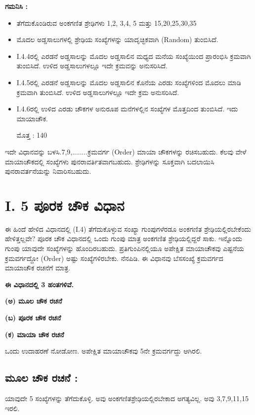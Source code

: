 \noindent	\textbf{ಗಮನಿಸಿ :}
\begin{itemize}
	\item ತೆಗೆದುಕೊಂಡಿರುವ ಅಂಕಗಣಿತ ಶ್ರೇಢಿಗಳು 1,2, 3,4, 5 ಮತ್ತು 15,20,25,30,35
	\item ಮೊದಲ ಅಡ್ಡಸಾಲುಗಳಲ್ಲಿ ಶ್ರೇಢಿಯ ಸಂಖ್ಯೆಗಳನ್ನು ಯಾದೃಚ್ಛಿಕವಾಗಿ (Random) ತುಂಬಿಸಿದೆ.
	\item I.4.4ರಲ್ಲಿ ಎರಡನೆ ಅಡ್ಡಸಾಲನ್ನು ಮೊದಲ ಅಡ್ಡಸಾಲಿನ ಮಧ್ಯದ ಮನೆಯ ಸಂಖ್ಯೆಯಿಂದ ಪ್ರಾರಂಭಿಸಿ ಕ್ರಮವಾಗಿ ತುಂಬಿಸಿದೆ. ಉಳಿದ ಅಡ್ಡಸಾಲುಗಳಲ್ಲೂ ಇದೇ ಕ್ರಮ\-ವನ್ನು ಅನುಸರಿಸಿದೆ.
	\item I.4.5ರಲ್ಲಿ ಎರಡನೆ ಅಡ್ಡಸಾಲನ್ನು ಮೊದಲ ಅಡ್ಡಸಾಲಿನ ಕೊನೆಯ ಎರಡು ಸಂಖ್ಯೆ\-ಗಳಿಂದ ಮೊದಲು ಮಾಡಿ ಕ್ರಮವಾಗಿ ತುಂಬಿಸಿದೆ. ಉಳಿದ ಅಡ್ಡಸಾಲುಗಳಲ್ಲೂ ಇದೇ ಕ್ರಮ ಅನುಸರಿಸಿದೆ.
	\item I.4.6ರಲ್ಲಿ ಉಳಿದ ಎರಡು ಚೌಕಗಳ ಅನುರೂಪ ಮನೆಗಳಲ್ಲಿನ ಸಂಖ್ಯೆಗಳ ಮೊತ್ತದಿಂದ ತುಂಬಿಸಿದೆ. ಇದು ಮಾಯಾಚೌಕ.

	ಮೊತ್ತ : 140
\end{itemize}
ಇದೇ ವಿಧಾನವನ್ನು ಬಳಸಿ.7,9,........ಕ್ರಮವರ್ಗ (Order) ಮಾಯಾ ಚೌಕಗಳನ್ನು ರಚಿಸ\-ಬಹುದು. ಕೆಲವು ವೇಳೆ ಮಾಯಾಚೌಕದಲ್ಲಿ ಸಂಖ್ಯೆಗಳು ಪುನರಾವರ್ತಿತವಾಗಬಹುದು.  ಶ್ರೇಢಿ\-ಗಳನ್ನು ಸೂಕ್ತವಾಗಿ ಬದಲಾಯಿಸಿ ಪುನರಾವರ್ತನೆಯನ್ನು ನಿವಾರಿಸಬಹುದು.

\section*{I. 5 ಪೂರಕ ಚೌಕ ವಿಧಾನ}

ಈ ಹಿಂದೆ ಹೇಳಿದ ವಿಧಾನದಲ್ಲಿ (I.4) ತೆಗೆದುಕೊಳ್ಳುವ ಸಂಖ್ಯಾ ಗುಂಪುಗಳೆರಡೂ ಅಂಕಗಣಿತ ಶ್ರೇಢಿಯಲ್ಲಿರಬೇಕೆಂದು ಹೇಳಿತ್ತಲ್ಲವೇ? ಪೂರಕ ಚೌಕ ವಿಧಾನದಲ್ಲಿ ಒಂದು ಗುಂಪು ಮಾತ್ರ ಅಂಕಗಣಿತ ಶ್ರೇಢಿಯಲ್ಲಿದ್ದರೆ ಸಾಕು. ಇನ್ನೊಂದು ಗುಂಪು ಯಾವುದೇ ಸಂಖ್ಯೆಗಳನ್ನು ಹೊಂದಿರಬಹುದು. ಪ್ರತಿಗುಂಪಿನಲ್ಲಿಯೂ ಅಪೇಕ್ಷಿತ ಮಾಯಾಚೌಕವು ಎಷ್ಟನೆಯ ಕ್ರಮವರ್ಗದ್ದೋ (Order) ಅಷ್ಟು ಸಂಖ್ಯೆಗಳಿರಬೇಕು. ನೆನಪಿಡಿ. ಈ ವಿಧಾನವು ಬೆಸಸಂಖ್ಯೆ ಕ್ರಮವರ್ಗದ ಮಾಯಾಚೌಕ ರಚನೆಗೆ ಮಾತ್ರ.

\medskip
\textbf{ಈ ವಿಧಾನದಲ್ಲಿ 3 ಹಂತಗಳಿವೆ.}\smallskip

\textbf{(ಅ) ಮೂಲ ಚೌಕ ರಚನೆ}

\textbf{(ಬ) ಪೂರಕ ಚೌಕ ರಚನೆ}

\textbf{(ಕ) ಮಾಯಾ ಚೌಕ ರಚನೆ}

ಒಂದು ಉದಾಹರಣೆ ನೋಡೋಣ. ಅಪೇಕ್ಷಿತ ಮಾಯಾಚೌಕವು 5ನೇ ಕ್ರಮವರ್ಗದ್ದು ಆಗಿರಲಿ.

\subsection*{ಮೂಲ ಚೌಕ ರಚನೆ :}

ಯಾವುದೇ 5 ಸಂಖ್ಯೆಗಳನ್ನು ತೆಗೆದುಕೊಳ್ಳಿ. ಅವು ಅಂಕಗಣಿತಶ್ರೇಢಿಯಲ್ಲಿರಬೇಕಾದ ಅಗತ್ಯ\-ವಿಲ್ಲ. ಅವು 3,7,9,11,15 ಇರಲಿ.

